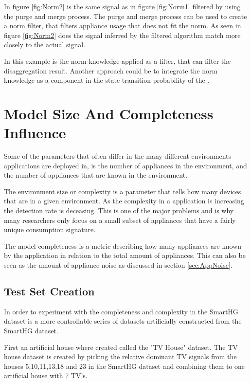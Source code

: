 In figure \ref{fig:Norm2} is the same signal as in figure \ref{fig:Norm1} filtered by using the purge and merge process. The purge and merge process can be used to create a norm filter, that filters appliance usage that does not fit the norm. As seen in figure \ref{fig:Norm2} does the signal inferred by the filtered  algorithm match more closely to the actual signal. 

In this example is the norm knowledge applied as a filter, that can filter the disaggregation result. Another approach could be to integrate the norm knowledge as a component in the state transition probability of the . 

\section{Model Size And Completeness Influence }
Some of the parameters that often differ in the many different environments  applications are deployed in, is the number of appliances in the environment, and the number of appliances that are known in the environment.  

The environment size or complexity is a parameter that tells how many devices that are in a given environment. As the complexity in a  application is increasing the detection rate is deceasing\citep{RefWorks:34}. This is one of the major problems and is why many researchers only focus on a small subset of appliances that have a fairly unique consumption signature. 

The model completeness is a metric describing how many appliances are known by the application in relation to the total amount of appliances. This can also be seen as the amount of appliance noise as discussed in section \ref{sec:AppNoise}.

\subsection{Test Set Creation}
\label{sec:datasetCreation}
In order to experiment with the completeness and complexity in the SmartHG dataset is a more controllable series of datasets artificially constructed from the SmartHG dataset. 

First an artificial house where created called the "TV House" dataset. The TV house dataset is created by picking the relative dominant TV signals from the houses 5,10,11,13,18 and 23 in the SmartHG dataset and combining them to one artificial house with 7 TV's. 

